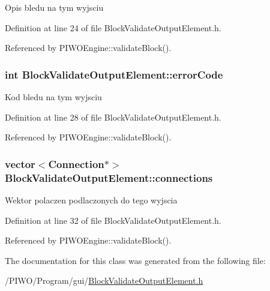 Opis bledu na tym wyjsciu 

Definition at line 24 of file BlockValidateOutputElement.h.

Referenced by PIWOEngine::validateBlock().\hypertarget{classBlockValidateOutputElement_47eb7f8967002402ac8d4b1d6ec3abbf}{
\subsubsection[errorCode]{\setlength{\rightskip}{0pt plus 5cm}int {\bf BlockValidateOutputElement::errorCode}}}
\label{classBlockValidateOutputElement_47eb7f8967002402ac8d4b1d6ec3abbf}


Kod bledu na tym wyjsciu 

Definition at line 28 of file BlockValidateOutputElement.h.

Referenced by PIWOEngine::validateBlock().\hypertarget{classBlockValidateOutputElement_7d6a09dcdc47578fe0580f342e45b78a}{
\subsubsection[connections]{\setlength{\rightskip}{0pt plus 5cm}vector$<${\bf Connection}$\ast$$>$ {\bf BlockValidateOutputElement::connections}}}
\label{classBlockValidateOutputElement_7d6a09dcdc47578fe0580f342e45b78a}


Wektor polaczen podlaczonych do tego wyjscia 

Definition at line 32 of file BlockValidateOutputElement.h.

Referenced by PIWOEngine::validateBlock().

The documentation for this class was generated from the following file:\begin{CompactItemize}
\item 
/PIWO/Program/gui/\hyperlink{BlockValidateOutputElement_8h}{BlockValidateOutputElement.h}\end{CompactItemize}
